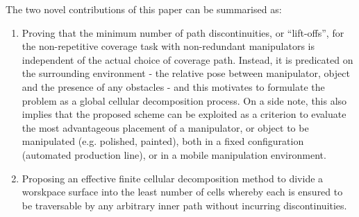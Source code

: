 \documentclass[journal]{IEEEtran}
\begin{document}

%
The two novel contributions of this paper can be summarised as: 
\begin{enumerate}
\item Proving that the minimum number of path discontinuities, or ``lift-offs'', for the non-repetitive coverage task with non-redundant manipulators is independent of the actual choice of coverage path. 
Instead, it is predicated on the surrounding environment - the relative pose between manipulator, object and the presence of any obstacles - and this motivates to formulate the problem as a global cellular decomposition process.
On a side note, this also implies that the proposed scheme can be exploited as a criterion to evaluate the most advantageous placement of a manipulator, or object to be manipulated (e.g. polished, painted), both in a fixed configuration (automated production line), or in a mobile manipulation environment. 
\item Proposing an effective finite cellular decomposition method to divide a worskpace surface into the least number of cells whereby each is ensured to be traversable by any arbitrary inner path without incurring discontinuities.
\end{enumerate}
\end{document}
